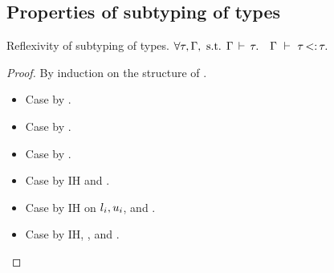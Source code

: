 \subsection{Properties of subtyping of types }%
\label{subsec:props-subty-proof}


\begin{theorem}{Reflexivity of subtyping of types.}\label{thm:sub-ty-refl}
    $
        \forall \tau, \Gamma, \text{ s.t. } \Gamma\,\vdash\,\tau.\quad
        \Gamma\ \vdash\ \tau \operatorname{<:} \tau.
    $
\end{theorem}
\begin{proof}
    By induction on the structure of \ty.
    \begin{itemize}
        \item Case \tyany by .
        \item Case \tybot by .
        \item Case \vany by .
        \item Case  by IH and .
        \item Case \tyinv{} by IH on
            $l_i, u_i$, and .
        \item Case  by IH, ,
            and .
    \end{itemize}
\end{proof}

